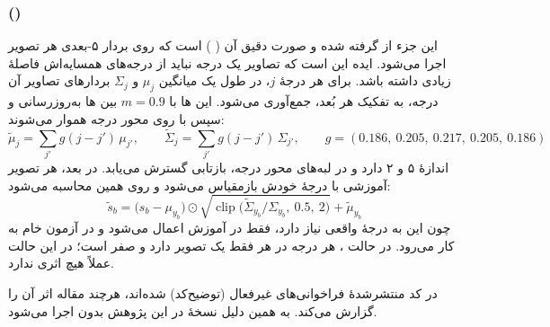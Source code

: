 \subsubsection{ ()}
\label{sec:sms}
این جزء از  \cite{clipdr} گرفته شده و صورت دقیق آن  ( \cite{fds}) است که روی بردار ۵-بعدی  هر تصویر اجرا می‌شود. ایده این است که  تصاویر یک درجه نباید از درجه‌های همسایه‌اش فاصلهٔ زیادی داشته باشد. برای هر درجهٔ $j$، در طول یک  میانگین $\mu_j$ و  $\Sigma_j$ بردارهای  تصاویر آن درجه، به تفکیک هر بُعد، جمع‌آوری می‌شود. این ها با  $m=0.9$ بین ها به‌روزرسانی و سپس با  روی محور درجه هموار می‌شوند:
\begin{equation}
\tilde{\mu}_j = \sum_{j'} g(j - j')\, \mu_{j'}, \qquad \tilde{\Sigma}_j = \sum_{j'} g(j - j')\, \Sigma_{j'}, \qquad g = (0.186,\ 0.205,\ 0.217,\ 0.205,\ 0.186)
\end{equation}
 اندازهٔ ۵ و  ۲ دارد و در لبه‌های محور درجه، بازتابی گسترش می‌یابد. در  بعد،  هر تصویر آموزشی با  درجهٔ خودش بازمقیاس می‌شود و  روی همین   محاسبه می‌شود:
\begin{equation}
\tilde{s}_b = \big(s_b - \mu_{y_b}\big) \odot \sqrt{\operatorname{clip}\!\big(\tilde{\Sigma}_{y_b} / \Sigma_{y_b},\ 0.5,\ 2\big)} + \tilde{\mu}_{y_b}
\label{eq:sms}
\end{equation}
چون این  به درجهٔ واقعی نیاز دارد، فقط در آموزش اعمال می‌شود و در آزمون  خام به کار می‌رود. در حالت ، هر درجه در هر  فقط یک تصویر دارد و  صفر است؛ در این حالت  عملاً هیچ اثری ندارد.

\begin{notebox}
در کد منتشرشدهٔ  فراخوانی‌های  غیرفعال (توضیح‌کد) شده‌اند، هرچند مقاله اثر آن را گزارش می‌کند. به همین دلیل نسخهٔ   در این پژوهش بدون  اجرا می‌شود.
\end{notebox}


